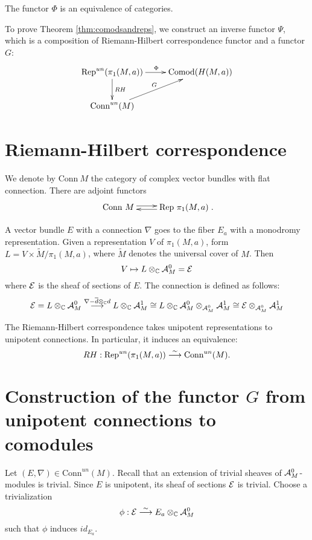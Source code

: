 \begin{thm}\label{thm:comodsandreps}
The functor $\Phi$ is an equivalence of categories.
\end{thm}


\noindent To prove Theorem \ref{thm:comodsandreps}, we construct an inverse functor $\Psi$, which is a composition of Riemann-Hilbert correspondence functor and a functor $G$:
\[
\xymatrix{
\mathrm{Rep}^{un}(\pi_1(M,a)) \ar[d]^{RH} \ar[r]^{\Phi} & \mathrm{Comod}(H(M,a)) \\
 \mathrm{Conn}^{un}(M) \ar[ur]^{G}& \\
}
\]

\section{Riemann-Hilbert correspondence}

\begin{notation}
We denote by $\mathrm{Conn~}M$ the category of complex vector bundles with flat connection. There are adjoint functors
\[
\xymatrix{\mathrm{Conn~}M \ar@<0.2em>[r] & \mathrm{Rep~} \pi_1(M,a) \ar@<0.2em>[l]}.
\]
\end{notation}

A vector bundle $E$ with a connection $\nabla$ goes to the fiber $E_a$ with a monodromy representation.
Given a representation $V$ of $\pi_1(M,a)$, form $L = V \times \widetilde{M} / \pi_1(M,a)$, where $\widetilde{M}$ denotes the universal cover of $M$. Then
\[
V \mapsto L \otimes_{\mathbb{C}} \mathcal{A}^0_M = \mathcal{E}
\]
where $\mathcal{E}$ is the sheaf of sections of $E$. The connection is defined as follows:
\[
\mathcal{E}=L \otimes_{\mathbb{C}} \mathcal{A}^0_M \stackrel{\nabla - \overline{d} \otimes_{\mathbb{C}} d}{\longrightarrow} L \otimes_{\mathbb{C}} \mathcal{A}^1_M \cong L \otimes_{\mathbb{C}} \mathcal{A}^0_M \otimes_{\mathcal{A}^0_M} \mathcal{A}^1_M \cong \mathcal{E} \otimes_{\mathcal{A}^0_M} \mathcal{A}^1_M
\]

\begin{prop}
The Riemann-Hilbert correspondence takes unipotent representations to unipotent connections. In particular, it induces an equivalence:
\[
RH : \mathrm{Rep}^{un}(\pi_1(M,a)) \stackrel{\sim}{\longrightarrow} \mathrm{Conn}^{un}(M).
\]
\end{prop}

\section{Construction of the functor $G$ from unipotent connections to comodules}

Let $(E, \nabla) \in \mathrm{Conn}^{un}(M)$. Recall that an extension of trivial sheaves of $\mathcal{A}^0_M$-modules is trivial. Since $E$ is unipotent, its sheaf of sections $\mathcal{E}$ is trivial. 
Choose a trivialization  
\[
\phi : \mathcal{E} \stackrel{\sim}{\longrightarrow} E_a \otimes_{\mathbb{C}} \mathcal{A}^0_M
\]
such that $\phi$ induces $id_{E_a}$.

